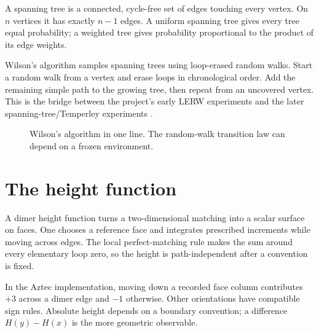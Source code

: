 \documentclass[11pt,a4paper,oneside,openany]{memoir}
\newcommand{\1}{\bm{1}}
\begin{document}
A spanning tree is a connected, cycle-free set of edges touching every vertex.
On $n$ vertices it has exactly $n-1$ edges. A uniform spanning tree gives every
tree equal probability; a weighted tree gives probability proportional to the
product of its edge weights.

Wilson's algorithm samples spanning trees using loop-erased random walks.
Start a random walk from a vertex and erase loops in chronological order. Add
the remaining simple path to the growing tree, then repeat from an uncovered
vertex. This is the bridge between the project's early LERW experiments and
the later spanning-tree/Temperley experiments \cite{Wilson1996,KPW2000}.

\begin{figure}[H]
\centering
{}
\caption{Wilson's algorithm in one line. The random-walk transition law can depend on a frozen environment.}
\end{figure}

\section{The height function}

A dimer height function turns a two-dimensional matching into a scalar surface
on faces. One chooses a reference face and integrates prescribed increments
while moving across edges. The local perfect-matching rule makes the sum around
every elementary loop zero, so the height is path-independent after a
convention is fixed.

In the Aztec implementation, moving down a recorded face column contributes
$+3$ across a dimer edge and $-1$ otherwise. Other orientations have compatible
sign rules. Absolute height depends on a boundary convention; a difference
$H(y)-H(x)$ is the more geometric observable.
\end{document}
